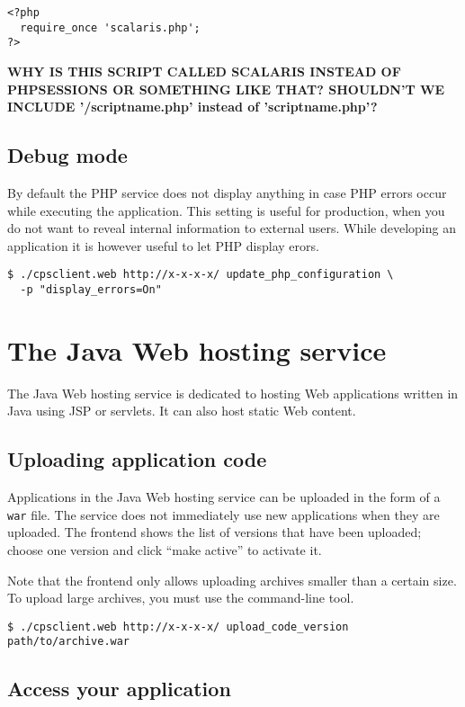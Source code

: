 \documentclass[10pt]{article}
\begin{document}
\begin{verbatim}
<?php
  require_once 'scalaris.php';
?>
\end{verbatim}

\textbf{WHY IS THIS SCRIPT CALLED SCALARIS INSTEAD OF PHPSESSIONS OR SOMETHING LIKE THAT? SHOULDN'T WE INCLUDE '/scriptname.php' instead of 'scriptname.php'?}


\subsection{Debug mode}

By default the PHP service does not display anything in case PHP
errors occur while executing the application. This setting is useful
for production, when you do not want to reveal internal information to
external users. While developing an application it is however useful
to let PHP display erors.
\begin{verbatim}
$ ./cpsclient.web http://x-x-x-x/ update_php_configuration \
  -p "display_errors=On" 
\end{verbatim}

\section{The Java Web hosting service}

The Java Web hosting service is dedicated to hosting Web applications
written in Java using JSP or servlets. It can also host static Web
content.

\subsection{Uploading application code}

Applications in the Java Web hosting service can be uploaded in the
form of a \texttt{war} file. The service does not immediately use new
applications when they are uploaded. The frontend shows the list of
versions that have been uploaded; choose one version and click ``make
active'' to activate it.  

Note that the frontend only allows uploading archives smaller than a
certain size.  To upload large archives, you must use the command-line
tool.
\begin{verbatim}
$ ./cpsclient.web http://x-x-x-x/ upload_code_version path/to/archive.war
\end{verbatim}

\subsection{Access your application}
\end{document}
